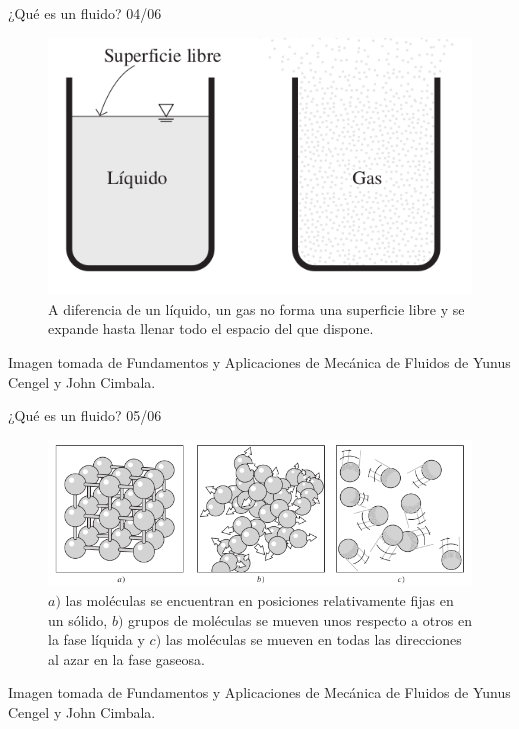 \begin{frame}{¿Qué es un fluido? 04/06}
\justifying
\begin{figure}[H]
\centering
\includegraphics[scale=0.3]{Section_Files/imagenes/sec01_0101_Fig01-04.png}
\caption{A diferencia de un líquido, un gas no forma una superficie libre y se expande hasta llenar todo el espacio del que dispone.}
\label{fig: Figura1-04}
\end{figure}
Imagen tomada de Fundamentos y Aplicaciones de Mecánica de Fluidos de Yunus Cengel y John Cimbala.
\end{frame}

\begin{frame}{¿Qué es un fluido? 05/06}
\justifying
\begin{figure}[H]
\centering
\includegraphics[scale=0.3]{Section_Files/imagenes/sec01_0101_Fig01-05.png}
\caption{ $a)$ las moléculas se encuentran en posiciones relativamente fijas en un sólido, $b)$ grupos de moléculas se mueven unos respecto a otros en la fase líquida y $c)$ las moléculas se mueven en todas las direcciones al azar en la fase gaseosa. }
\label{fig: Figura1-05}
\end{figure}
Imagen tomada de Fundamentos y Aplicaciones de Mecánica de Fluidos de Yunus Cengel y John Cimbala.
\end{frame}
	
